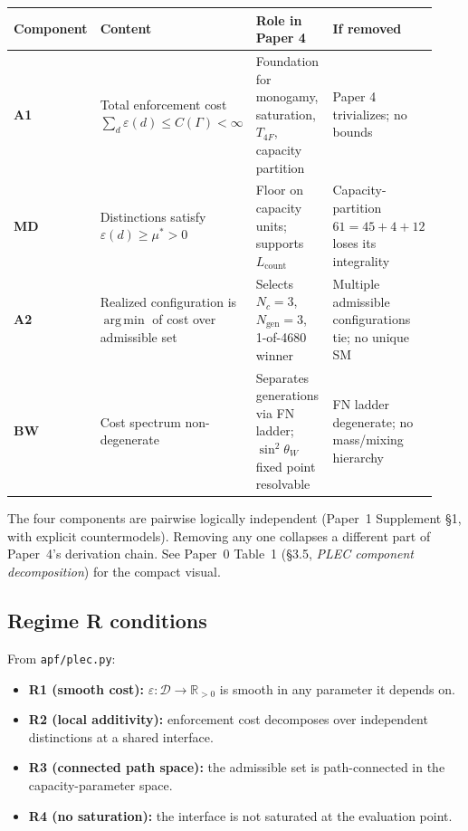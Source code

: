 \documentclass[11pt]{article}
\newcommand{\Aone}{\textbf{A1}}
\newcommand{\Atwo}{\textbf{A2}}
\newcommand{\MD}{\textbf{MD}}
\newcommand{\BW}{\textbf{BW}}
\DeclareMathOperator*{\argmin}{arg\,min}
\theoremstyle{definition}
\begin{document}
\begin{center}\small
\begin{tabular}{@{}>{\raggedright\arraybackslash}p{0.08\linewidth} >{\raggedright\arraybackslash}p{0.35\linewidth} >{\raggedright\arraybackslash}p{0.24\linewidth} >{\raggedright\arraybackslash}p{0.26\linewidth}@{}}
\toprule
\textbf{Component} & \textbf{Content} & \textbf{Role in Paper 4} & \textbf{If removed} \\
\midrule
\Aone{} & Total enforcement cost $\sum_d \varepsilon(d) \leq C(\Gamma) < \infty$ & Foundation for monogamy, saturation, $T_{4F}$, capacity partition & Paper 4 trivializes; no bounds \\
\MD{}   & Distinctions satisfy $\varepsilon(d) \geq \mu^* > 0$ & Floor on capacity units; supports $L_{\mathrm{count}}$ & Capacity-partition $61 = 45+4+12$ loses its integrality \\
\Atwo{} & Realized configuration is $\argmin$ of cost over admissible set & Selects $N_c = 3$, $N_{\mathrm{gen}} = 3$, 1-of-4680 winner & Multiple admissible configurations tie; no unique SM \\
\BW{}   & Cost spectrum non-degenerate & Separates generations via FN ladder; $\sin^2\theta_W$ fixed point resolvable & FN ladder degenerate; no mass/mixing hierarchy \\
\bottomrule
\end{tabular}
\end{center}

The four components are pairwise logically independent (Paper~1 Supplement \S1, with explicit countermodels). Removing any one collapses a different part of Paper~4's derivation chain. See Paper~0 Table~1 (\S3.5, \emph{PLEC component decomposition}) for the compact visual.

\subsection{Regime R conditions}\label{sec:assumptions_regime_R}

From \texttt{apf/plec.py}:

\begin{itemize}
    \item \textbf{R1 (smooth cost):} $\varepsilon: \mathcal{D} \to \mathbb{R}_{>0}$ is smooth in any parameter it depends on.
    \item \textbf{R2 (local additivity):} enforcement cost decomposes over independent distinctions at a shared interface.
    \item \textbf{R3 (connected path space):} the admissible set is path-connected in the capacity-parameter space.
    \item \textbf{R4 (no saturation):} the interface is not saturated at the evaluation point.
\end{itemize}
\end{document}

